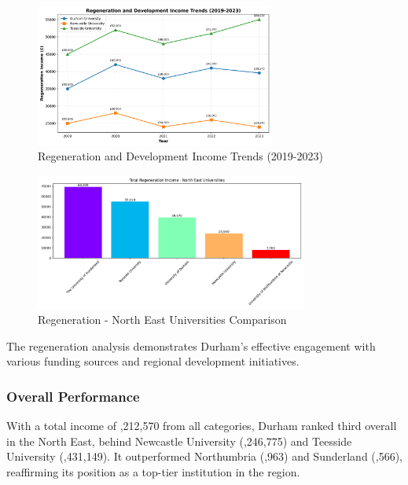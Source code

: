 \documentclass[journal,onecolumn, 10pt,draftclsnofoot]{IEEEtran}
\begin{document}
\begin{figure}[h]
\centering
\includegraphics[width=0.7\textwidth]{Fig/figure15.regeneration_time_trend.png}
\caption{Regeneration and Development Income Trends (2019-2023)}
\label{fig:regeneration-time-trend}
\end{figure}

\begin{figure}[h]
\centering
\includegraphics[width=0.8\textwidth]{Fig/figure16.regeneration_ne_comparison.png}
\caption{Regeneration - North East Universities Comparison}
\label{fig:regeneration-ne-comparison}
\end{figure}

The regeneration analysis demonstrates Durham's effective engagement with various funding sources and regional development initiatives.

\subsubsection{Overall Performance}

With a total income of ,212,570 from all categories, Durham ranked third overall in the North East, behind Newcastle University (,246,775) and Teesside University (,431,149). It outperformed Northumbria (,963) and Sunderland (,566), reaffirming its position as a top-tier institution in the region.
\end{document}
